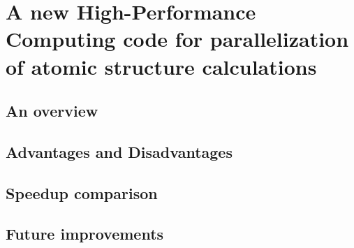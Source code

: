 
%

\chapter{A new High-Performance Computing code for parallelization of atomic structure calculations}

\section{An overview}

\section{Advantages and Disadvantages}

\section{Speedup comparison}

\section{Future improvements}
